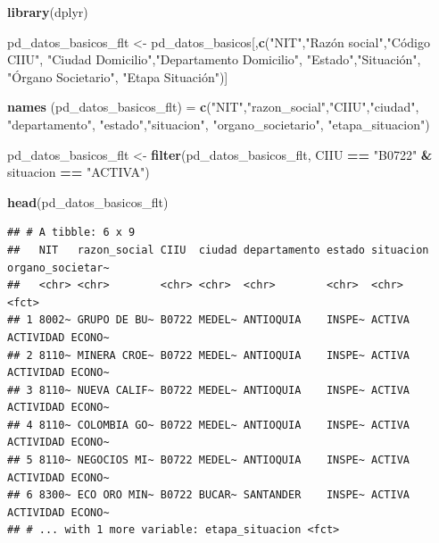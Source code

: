 \documentclass[
  11pt,
  a4paper,
]{book}
\newenvironment{Shaded}{\begin{snugshade}}{\end{snugshade}}
\newcommand{\KeywordTok}[1]{\textcolor[rgb]{0.13,0.29,0.53}{\textbf{#1}}}
\newcommand{\NormalTok}[1]{#1}
\newcommand{\OperatorTok}[1]{\textcolor[rgb]{0.81,0.36,0.00}{\textbf{#1}}}
\newcommand{\StringTok}[1]{\textcolor[rgb]{0.31,0.60,0.02}{#1}}
\begin{document}
\begin{Shaded}
\begin{Highlighting}[]
\KeywordTok{library}\NormalTok{(dplyr)}

\NormalTok{pd_datos_basicos_flt <-}\StringTok{ }\NormalTok{pd_datos_basicos[,}\KeywordTok{c}\NormalTok{(}\StringTok{"NIT"}\NormalTok{,}\StringTok{"Razón social"}\NormalTok{,}\StringTok{"Código CIIU"}\NormalTok{,}
      \StringTok{"Ciudad Domicilio"}\NormalTok{,}\StringTok{"Departamento Domicilio"}\NormalTok{, }\StringTok{"Estado"}\NormalTok{,}\StringTok{"Situación", }
\StringTok{      "}\NormalTok{Órgano Societario}\StringTok{", "}\NormalTok{Etapa Situación")]}

\KeywordTok{names}\NormalTok{ (pd_datos_basicos_flt) =}\StringTok{ }\KeywordTok{c}\NormalTok{(}\StringTok{"NIT"}\NormalTok{,}\StringTok{"razon_social"}\NormalTok{,}\StringTok{"CIIU"}\NormalTok{,}\StringTok{"ciudad"}\NormalTok{,}
                                 \StringTok{"departamento"}\NormalTok{, }\StringTok{"estado"}\NormalTok{,}\StringTok{"situacion"}\NormalTok{, }
                                 \StringTok{"organo_societario"}\NormalTok{, }\StringTok{"etapa_situacion"}\NormalTok{)}

\NormalTok{pd_datos_basicos_flt <-}\StringTok{ }\KeywordTok{filter}\NormalTok{(pd_datos_basicos_flt, CIIU }\OperatorTok{==}\StringTok{ "B0722"} \OperatorTok{&}\StringTok{ }
\StringTok{                                 }\NormalTok{situacion }\OperatorTok{==}\StringTok{ "ACTIVA"}\NormalTok{)}

\KeywordTok{head}\NormalTok{(pd_datos_basicos_flt)}
\end{Highlighting}
\end{Shaded}

\begin{verbatim}
## # A tibble: 6 x 9
##   NIT   razon_social CIIU  ciudad departamento estado situacion organo_societar~
##   <chr> <chr>        <chr> <chr>  <chr>        <chr>  <chr>     <fct>           
## 1 8002~ GRUPO DE BU~ B0722 MEDEL~ ANTIOQUIA    INSPE~ ACTIVA    ACTIVIDAD ECONO~
## 2 8110~ MINERA CROE~ B0722 MEDEL~ ANTIOQUIA    INSPE~ ACTIVA    ACTIVIDAD ECONO~
## 3 8110~ NUEVA CALIF~ B0722 MEDEL~ ANTIOQUIA    INSPE~ ACTIVA    ACTIVIDAD ECONO~
## 4 8110~ COLOMBIA GO~ B0722 MEDEL~ ANTIOQUIA    INSPE~ ACTIVA    ACTIVIDAD ECONO~
## 5 8110~ NEGOCIOS MI~ B0722 MEDEL~ ANTIOQUIA    INSPE~ ACTIVA    ACTIVIDAD ECONO~
## 6 8300~ ECO ORO MIN~ B0722 BUCAR~ SANTANDER    INSPE~ ACTIVA    ACTIVIDAD ECONO~
## # ... with 1 more variable: etapa_situacion <fct>
\end{verbatim}
\end{document}
